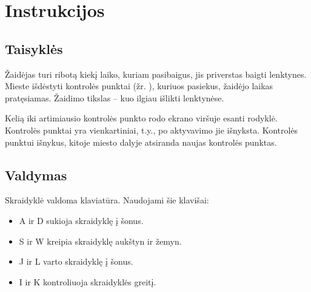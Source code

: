 \section{Instrukcijos}
\subsection{Taisyklės}

Žaidėjas turi ribotą kiekį laiko, kuriam pasibaigus, jis priverstas baigti lenktynes.
Mieste išdėstyti kontrolės punktai (žr. ), kuriuos pasiekus, žaidėjo laikas pratęsiamas.
Žaidimo tikslas -- kuo ilgiau išlikti lenktynėse.


Kelią iki artimiausio kontrolės punkto rodo ekrano viršuje esanti rodyklė.
Kontrolės punktai yra vienkartiniai, t.y., po aktyvavimo jie išnyksta.
Kontrolės punktui išnykus, kitoje miesto dalyje atsiranda naujas kontrolės punktas.

\subsection{Valdymas}

Skraidyklė valdoma klaviatūra.
Naudojami šie klavišai:
\begin{itemize}
\item A ir D sukioja skraidyklę į šonus.
\item S ir W kreipia skraidyklę aukštyn ir žemyn.
\item J ir L varto skraidyklę į šonus.
\item I ir K kontroliuoja skraidyklės greitį.
\end{itemize}
